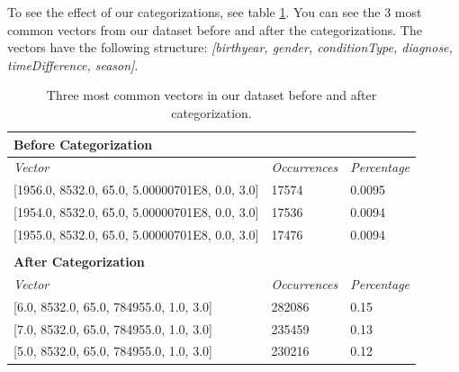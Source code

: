 To see the effect of our categorizations, see table \ref{tab:general}. You can see the $3$ most common vectors from our dataset before and after the categorizations. The vectors have the following structure: \textit{{[}birthyear, gender, conditionType, diagnose, timeDifference, season{]}}. \\

\begin{table}[!htb]
\centering

\label{tab:general}
\begin{tabular}{lll}
\hline
\textbf{Before Categorization}                                                    &                             &                     \\ \hline
\textit{Vector} & \textit{Occurrences}        & \textit{Percentage} \\ \hline
\multicolumn{1}{l|}{{[}1956.0, 8532.0, 65.0, 5.00000701E8, 0.0, 3.0{]}}           & \multicolumn{1}{l|}{17574}  & 0.0095              \\
\multicolumn{1}{l|}{{[}1954.0, 8532.0, 65.0, 5.00000701E8, 0.0, 3.0{]}}           & \multicolumn{1}{l|}{17536}  & 0.0094              \\
\multicolumn{1}{l|}{{[}1955.0, 8532.0, 65.0, 5.00000701E8, 0.0, 3.0{]}}           & \multicolumn{1}{l|}{17476}  & 0.0094              \\
                                                                                  &                             &                     \\ \hline
\textbf{After Categorization}                                                     &                             &                     \\ \hline
\textit{Vector} & \textit{Occurrences}        & \textit{Percentage} \\ \hline
\multicolumn{1}{l|}{{[}6.0, 8532.0, 65.0, 784955.0, 1.0, 3.0{]}}                  & \multicolumn{1}{l|}{282086} & 0.15                \\
\multicolumn{1}{l|}{{[}7.0, 8532.0, 65.0, 784955.0, 1.0, 3.0{]}}                  & \multicolumn{1}{l|}{235459} & 0.13                \\
\multicolumn{1}{l|}{{[}5.0, 8532.0, 65.0, 784955.0, 1.0, 3.0{]}}                  & \multicolumn{1}{l|}{230216} & 0.12               
\end{tabular}

\caption{Three most common vectors in our dataset before and after categorization.}
\end{table}


